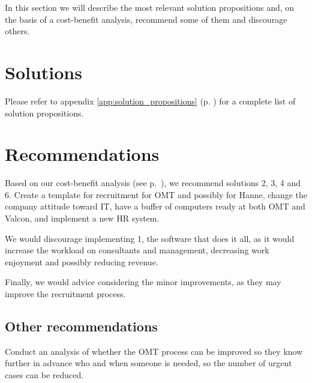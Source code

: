 In this section we will describe the most relevant solution propositions and, on the basis of a cost-benefit analysis, recommend some of them and discourage others.

\section{Solutions}
Please refer to appendix \ref{app:solution_propositions} (p. \pageref{app:solution_propositions}) for a complete list of solution propositions.

\section{Recommendations}
Based on our cost-benefit analysis (see p.~\pageref{app:cost_benefit_analysis}), we recommend solutions 2, 3, 4 and 6.
Create a template for recruitment for OMT and possibly for Hanne, change the company attitude toward IT, have a buffer of computers ready at both OMT and Valcon, and implement a new HR system.

We would discourage implementing 1, the software that does it all, as it would increase the workload on consultants and management, decreasing work enjoyment and possibly reducing revenue.

Finally, we would advice considering the minor improvements, as they may improve the recruitment process.

\subsection{Other recommendations}
Conduct an analysis of whether the OMT process can be improved so they know further in advance who and when someone is needed, so the number of urgent cases can be reduced.